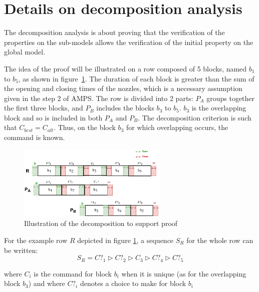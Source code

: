 \newpage

\section{Details on decomposition analysis}
The decomposition analysis is about proving that the verification of the properties on the sub-models allows the verification of the initial property on the global model. 

The idea of the proof will be illustrated on a row composed of 5 blocks, named $b_1$ to $ b_5 $, as shown in figure~\ref{fig:decompooA}. The duration of each block is greater than the sum of the opening and closing times of the nozzles, which is a necessary assumption given in the step 2 of AMPS. The row is divided into 2 parts: $ P_A $ groups together the first three blocks, and $ P_B $ includes the blocks $ b_3 $ to $ b_5 $. $b_{3}$ is the overlapping block and so is included in both $P_A$ and $P_B$. The decomposition criterion is such that $C_{best}=C_{alt}$. Thus, on the block $b_3$ for which overlapping occurs, the command is known.


\begin{figure}[h!]
	\begin{center}
		\includegraphics[width=7.2cm]{decompo2.pdf} 
		\caption{Illustration of the decomposition to support proof} 
		\label{fig:decompooA}
	\end{center}
\end{figure} 

For the example row $R$ depicted in figure \ref{fig:decompooA}, a sequence $S_R$ for the whole row can be written:
\begin{equation}
	S_R = C?_{1} \triangleright C?_{2} \triangleright C_{3} \triangleright C?_{4} \triangleright C?_{5}  \label{eq:SRExampleA}
\end{equation} %

where $C_{i}$ is the command for block $b_{i}$ when it is unique (as for the overlapping block $b_3$) and where $C?_{i}$ denotes a choice to make for block $b_i$


